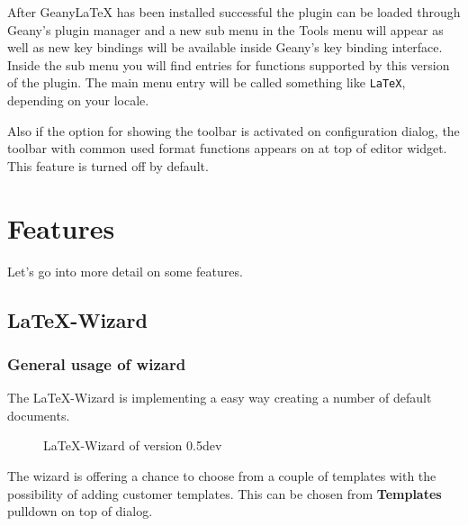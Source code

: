 \documentclass[%
paper=a4,%
fontsize=11pt,%
twoside=false,%
DIV18,
headsepline,
plainheadsepline,
footsepline,
plainfootsepline,
bibliography=totoc,%
listof=totoc,%
BCOR10mm,%
parskip=half,%
openany,%
]{scrartcl}
\begin{document}
After Geany\LaTeX{} has been installed successful the plugin can be
loaded through Geany's plugin manager and a new sub menu in the Tools
menu will appear as well as new key bindings will be available inside
Geany's key binding interface. Inside the sub menu you will find entries
for functions supported by this version of the plugin. The main menu entry
will be called something like \texttt{LaTeX}, depending on your locale.

Also if the option for showing the toolbar is activated on configuration
dialog, the toolbar with common used format functions appears on at top
of editor widget. This feature is turned off by default.


\section{Features}

Let's go into more detail on some features.


\subsection{\LaTeX-Wizard}

\subsubsection{General usage of wizard}
The \LaTeX-Wizard is implementing a easy way creating a number of
default documents.
\begin{figure}[h!]
	\caption{\LaTeX-Wizard of version 0.5dev}
\end{figure}

The wizard is offering a chance to choose from a couple of templates
with the possibility of adding customer templates. This can be
chosen from \textbf{Templates} pulldown on top of dialog.
\end{document}
